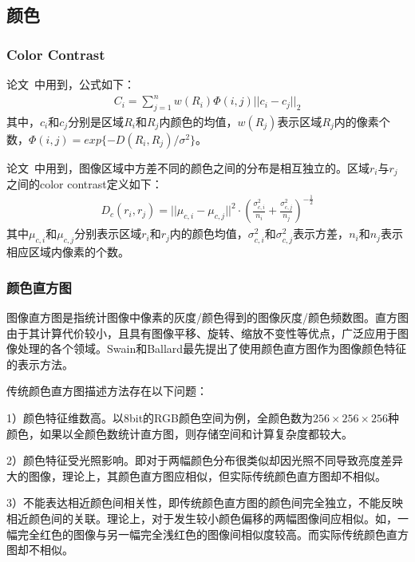 \documentclass[12pt]{article}
\begin{document}
\subsection{颜色}

\subsubsection{Color Contrast}

论文~\cite{yan2013hierarchical}中用到，公式如下：
\begin{align}
C_i = \sum_{j=1}^{n}w(R_i)\Phi(i, j)||c_i-c_j||_2
\end{align}
其中，$c_i$和$c_j$分别是区域$R_i$和$R_j$内颜色的均值，$w(R_j)$表示区域$R_j$内的像素个数，$\Phi(i, j) = exp\{ -D(R_i, R_j)/\sigma^2\}$。

论文~\cite{zhu2014tag}中用到，图像区域中方差不同的颜色之间的分布是相互独立的。区域$r_i$与$r_j$之间的color contrast定义如下：
\begin{align}
D_c(r_i, r_j) = ||\mu_{c, i}-\mu_{c, j}||^2\cdot \left(\frac{\sigma_{c, i}^2}{n_i}+\frac{\sigma_{c, j}^2}{n_j}\right)^{-\frac{1}{2}}
\end{align}
其中$\mu_{c, i}$和$\mu_{c, j}$分别表示区域$r_i$和$r_j$内的颜色均值，$\sigma_{c, i}^2$和$\sigma_{c, j}^2$表示方差，$n_i$和$n_j$表示相应区域内像素的个数。

\subsubsection{颜色直方图}

图像直方图是指统计图像中像素的灰度/颜色得到的图像灰度/颜色频数图。直方图由于其计算代价较小，且具有图像平移、旋转、缩放不变性等优点，广泛应用于图像处理的各个领域。Swain和Ballard最先提出了使用颜色直方图作为图像颜色特征的表示方法。

传统颜色直方图描述方法存在以下问题：

1）颜色特征维数高。以8bit的RGB颜色空间为例，全颜色数为$256 \times 256 \times 256$种颜色，如果以全颜色数统计直方图，则存储空间和计算复杂度都较大。

2）颜色特征受光照影响。即对于两幅颜色分布很类似却因光照不同导致亮度差异大的图像，理论上，其颜色直方图应相似，但实际传统颜色直方图却不相似。

3）不能表达相近颜色间相关性，即传统颜色直方图的颜色间完全独立，不能反映相近颜色间的关联。理论上，对于发生较小颜色偏移的两幅图像间应相似。如，一幅完全红色的图像与另一幅完全浅红色的图像间相似度较高。而实际传统颜色直方图却不相似。
\end{document}
